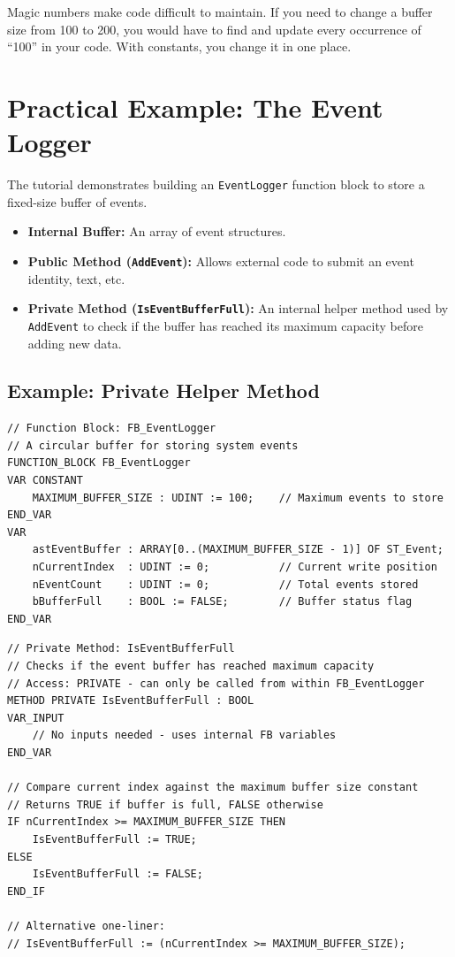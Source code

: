 \documentclass[11pt,a4paper]{article}
\begin{document}
\begin{warningbox}
Magic numbers make code difficult to maintain. If you need to change a buffer size from 100 to 200, you would have to find and update every occurrence of ``100'' in your code. With constants, you change it in one place.
\end{warningbox}

\section{Practical Example: The Event Logger}

The tutorial demonstrates building an \texttt{EventLogger} function block to store a fixed-size buffer of events.

\begin{itemize}[leftmargin=*]
    \item \textbf{Internal Buffer:} An array of event structures.
    
    \item \textbf{Public Method (\texttt{AddEvent}):} Allows external code to submit an event identity, text, etc.
    
    \item \textbf{Private Method (\texttt{IsEventBufferFull}):} An internal helper method used by \texttt{AddEvent} to check if the buffer has reached its maximum capacity before adding new data.
\end{itemize}

\subsection*{Example: Private Helper Method}

\begin{lstlisting}
// Function Block: FB_EventLogger
// A circular buffer for storing system events
FUNCTION_BLOCK FB_EventLogger
VAR CONSTANT
    MAXIMUM_BUFFER_SIZE : UDINT := 100;    // Maximum events to store
END_VAR
VAR
    astEventBuffer : ARRAY[0..(MAXIMUM_BUFFER_SIZE - 1)] OF ST_Event;
    nCurrentIndex  : UDINT := 0;           // Current write position
    nEventCount    : UDINT := 0;           // Total events stored
    bBufferFull    : BOOL := FALSE;        // Buffer status flag
END_VAR
\end{lstlisting}

\begin{lstlisting}
// Private Method: IsEventBufferFull
// Checks if the event buffer has reached maximum capacity
// Access: PRIVATE - can only be called from within FB_EventLogger
METHOD PRIVATE IsEventBufferFull : BOOL
VAR_INPUT
    // No inputs needed - uses internal FB variables
END_VAR

// Compare current index against the maximum buffer size constant
// Returns TRUE if buffer is full, FALSE otherwise
IF nCurrentIndex >= MAXIMUM_BUFFER_SIZE THEN
    IsEventBufferFull := TRUE;
ELSE
    IsEventBufferFull := FALSE;
END_IF

// Alternative one-liner:
// IsEventBufferFull := (nCurrentIndex >= MAXIMUM_BUFFER_SIZE);
\end{lstlisting}
\end{document}
